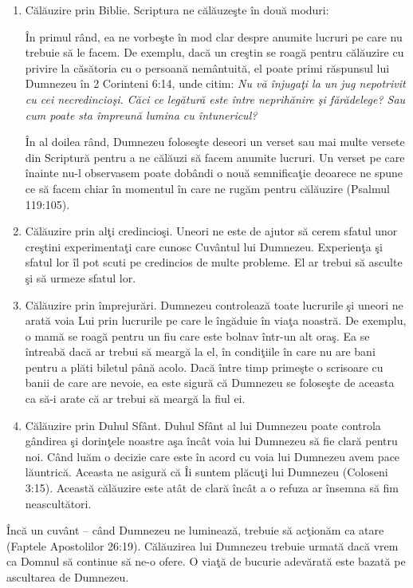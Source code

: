 \begin{enumerate}

	\item Călăuzire prin Biblie. Scriptura ne călăuzeşte în două moduri:
	
	În primul rând, ea ne vorbeşte în mod clar despre anumite lucruri pe care nu trebuie să le facem. De exemplu, dacă un creştin se roagă pentru călăuzire cu privire la căsătoria cu o persoană nemântuită, el poate primi răspunsul lui Dumnezeu în 2 Corinteni 6:14, unde citim: \textit{Nu vă înjugaţi la un jug nepotrivit cu cei necredincioşi. Căci ce legătură este între neprihănire şi fărădelege? Sau cum poate sta împreună lumina cu întunericul?} 

	În al doilea rând, Dumnezeu foloseşte deseori un verset sau mai multe versete din Scriptură pentru a ne călăuzi să facem anumite lucruri. Un verset pe care înainte nu-l observasem poate dobândi o nouă semnificaţie deoarece ne spune ce să facem chiar în momentul în care ne rugăm pentru călăuzire (Psalmul 119:105).

	\item Călăuzire prin alţi credincioşi. Uneori ne este de ajutor să cerem sfatul unor creştini experimentaţi care cunosc Cuvântul lui Dumnezeu. Experienţa şi sfatul lor îl pot scuti pe credincios de multe probleme. El ar trebui să asculte şi să urmeze sfatul lor.
	
	\item Călăuzire prin împrejurări. Dumnezeu controlează toate lucrurile şi uneori ne arată voia Lui prin lucrurile pe care le îngăduie în viaţa noastră. De exemplu, o mamă se roagă pentru un fiu care este bolnav într-un alt oraş. Ea se întreabă dacă ar trebui să meargă la el, în condiţiile în care nu are bani pentru a plăti biletul până acolo. Dacă între timp primeşte o scrisoare cu banii de care are nevoie, ea este sigură că Dumnezeu se foloseşte de aceasta ca să-i arate că ar trebui să meargă la fiul ei.
	
	\item Călăuzire prin Duhul Sfânt. Duhul Sfânt al lui Dumnezeu poate controla gândirea şi dorinţele noastre aşa încât voia lui Dumnezeu să fie clară pentru noi. Când luăm o decizie care este în acord cu voia lui Dumnezeu avem pace lăuntrică. Aceasta ne asigură că Îi suntem plăcuţi lui Dumnezeu (Coloseni 3:15). Această călăuzire este atât de clară încât a o refuza ar însemna să fim neascultători. 
	
\end{enumerate}

Încă un cuvânt – când Dumnezeu ne luminează, trebuie să acţionăm ca atare (Faptele Apostolilor 26:19). Călăuzirea lui Dumnezeu trebuie urmată dacă vrem ca Domnul să continue să ne-o ofere. O viaţă de bucurie adevărată este bazată pe ascultarea de Dumnezeu. 
